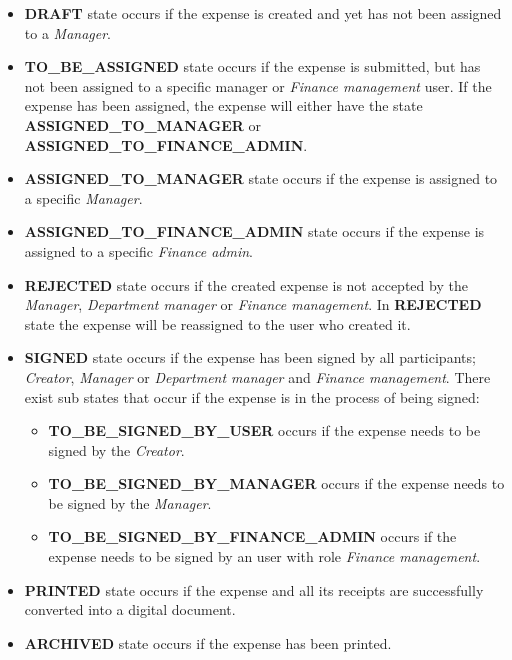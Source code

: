 \begin{itemize}
    \item \textbf{DRAFT} state occurs if the expense is created and yet has not been assigned to a \textit{Manager}.
    
    \item \textbf{TO\_BE\_ASSIGNED} state occurs if the expense is submitted, but has not been assigned to a specific manager or \textit{Finance management} user. If the expense has been assigned, the expense will either have the state \textbf{ASSIGNED\_TO\_MANAGER} or \textbf{ASSIGNED\_TO\_FINANCE\_ADMIN}.
    
    \item \textbf{ASSIGNED\_TO\_MANAGER} state occurs if the expense is assigned to a specific \textit{Manager}.
    
    \item \textbf{ASSIGNED\_TO\_FINANCE\_ADMIN} state occurs if the expense is assigned to a specific \textit{Finance admin}.
    
    \item \textbf{REJECTED} state occurs if the created expense is not accepted by the \textit{Manager}, \textit{Department manager} or \textit{Finance management}. In \textbf{REJECTED} state the expense will be reassigned to the user who created it.
    
    \item \textbf{SIGNED} state occurs if the expense has been signed by all participants; \textit{Creator}, \textit{Manager} or \textit{Department manager} and \textit{Finance management}. There exist sub states that occur if the expense is in the process of being signed:
        \begin{itemize}
            \item \textbf{TO\_BE\_SIGNED\_BY\_USER} occurs if the expense needs to be signed by the \textit{Creator}.
            \item \textbf{TO\_BE\_SIGNED\_BY\_MANAGER} occurs if the expense needs to be signed by the \textit{Manager}.
            \item \textbf{TO\_BE\_SIGNED\_BY\_FINANCE\_ADMIN} occurs if the expense needs to be signed by an user with role \textit{Finance management}.
        \end{itemize}
    
    \item \textbf{PRINTED} state occurs if the expense and all its receipts are successfully converted into a digital document.
    
    \item \textbf{ARCHIVED} state occurs if the expense has been printed.
\end{itemize}

